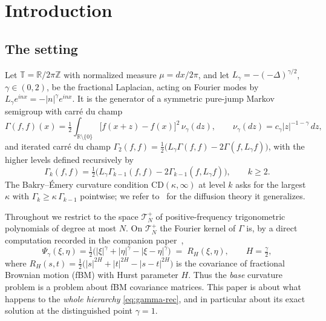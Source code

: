 \documentclass[11pt,reqno]{amsart}
\theoremstyle{plain}
\theoremstyle{definition}
\newcommand{\T}{\mathbb{T}}
\newcommand{\R}{\mathbb{R}}
\newcommand{\Z}{\mathbb{Z}}
\newcommand{\Gam}{\Gamma}
\begin{document}
\section{Introduction}\label{sec:intro}

\subsection*{The setting}
Let $\T=\R/2\pi\Z$ with normalized measure $\mu=dx/2\pi$, and let
$L_\gamma=-(-\Delta)^{\gamma/2}$, $\gamma\in(0,2)$, be the fractional Laplacian,
acting on Fourier modes by $L_\gamma e^{inx}=-|n|^{\gamma}e^{inx}$. It is the
generator of a symmetric pure-jump Markov semigroup with carr\'e du champ
\begin{equation}\label{eq:carre}
  \Gam(f,f)(x)=\tfrac12\int_{\R\setminus\{0\}}\!\bigl[f(x{+}z)-f(x)\bigr]^2
  \,\nu_\gamma(dz),\qquad \nu_\gamma(dz)=c_\gamma|z|^{-1-\gamma}\,dz,
\end{equation}
and iterated carr\'e du champ
$\Gam_2(f,f)=\tfrac12\bigl(L_\gamma\Gam(f,f)-2\Gam(f,L_\gamma f)\bigr)$, with the
higher levels defined recursively by
\begin{equation}\label{eq:gamma-rec}
  \Gam_{k}(f,f)=\tfrac12\bigl(L_\gamma\Gam_{k-1}(f,f)-2\Gam_{k-1}(f,L_\gamma f)\bigr),
  \qquad k\ge2 .
\end{equation}
The Bakry--\'Emery curvature condition $\mathrm{CD}(\kappa,\infty)$ at level $k$
asks for the largest $\kappa$ with $\Gam_k\ge\kappa\,\Gam_{k-1}$ pointwise; we
refer to~\cite{BGL} for the diffusion theory it generalizes.

Throughout we restrict to the space $\mathcal T_N^{+}$ of positive-frequency
trigonometric polynomials of degree at most $N$. On $\mathcal T_N^{+}$ the
Fourier kernel of $\Gam$ is, by a direct computation recorded in the companion
paper~\cite{FontesPartI},
\begin{equation}\label{eq:psi}
  \Psi_\gamma(\xi,\eta)=\tfrac12\bigl(|\xi|^{\gamma}+|\eta|^{\gamma}-|\xi-\eta|^{\gamma}\bigr)
  \;=\;R_H(\xi,\eta),\qquad H=\tfrac\gamma2,
\end{equation}
where $R_H(s,t)=\tfrac12\bigl(|s|^{2H}+|t|^{2H}-|s-t|^{2H}\bigr)$ is the
covariance of fractional Brownian motion (fBM) with Hurst parameter $H$. Thus the
\emph{base} curvature problem is a problem about fBM covariance matrices. This
paper is about what happens to the \emph{whole hierarchy}
\eqref{eq:gamma-rec}, and in particular about its exact solution at the
distinguished point $\gamma=1$.
\end{document}
